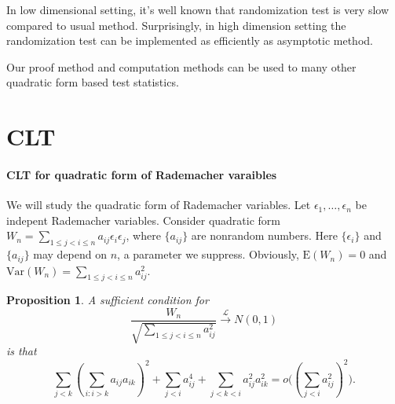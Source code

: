 \documentclass[review]{elsarticle}
\theoremstyle{plain}
\newtheorem{proposition}{\quad\quad Proposition}
\theoremstyle{definition}
\theoremstyle{remark}
\begin{document}
In low dimensional setting, it's well known that randomization test is very slow compared to usual method. 
Surprisingly, in high dimension setting the randomization test can be implemented as efficiently as asymptotic method.

Our proof method and computation methods can be used to many other quadratic form based test statistics.

\section{CLT}
\paragraph{CLT for quadratic form of Rademacher varaibles}
We will study the quadratic form of Rademacher variables.
 Let $\epsilon_1,\ldots,\epsilon_n$ be indepent Rademacher  variables. 
 Consider quadratic form $W_n=\sum_{1\leq j<i\leq n} a_{ij}\epsilon_i \epsilon_j$, where $\{a_{ij}\}$ are nonrandom numbers. Here $\{\epsilon_i\}$ and $\{a_{ij}\}$ may depend on $n$, a parameter we suppress.
 Obviously, $\mathrm{E}(W_n)=0$ and $\mathrm{Var}(W_n)=\sum_{1\leq j<i\leq n} a_{ij}^2$.

 \begin{proposition}\label{CLTprop}
     A sufficient condition for
     \begin{equation}
         \frac{W_n}{\sqrt{\sum_{1\leq j<i\leq n} a_{ij}^2}}\xrightarrow{\mathcal{L}} N(0,1)
     \end{equation}
     is that
     \begin{equation}
         \sum_{j<k}{(\sum_{i:i>k}a_{ij}a_{ik})}^2+
         \sum_{j<i}a_{ij}^4+
         \sum_{j<k<i}a_{ij}^2 a_{ik}^2
         =o\big({(\sum_{j<i} a_{ij}^2)}^2\big).
     \end{equation}
 \end{proposition}
\end{document}
